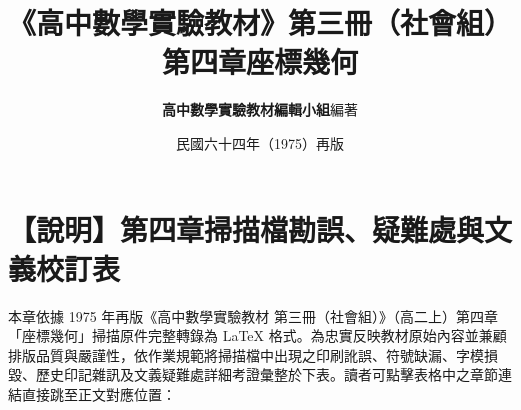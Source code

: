 \documentclass[a4paper,12pt,twoside]{article}
\title{\LARGE\textbf{《高中數學實驗教材》第三冊（社會組）}\\[0.5em] \Large\textbf{第四章\quad 座標幾何}}
\author{\textbf{高中數學實驗教材編輯小組}\quad 編著}
\date{民國六十四年（1975）再版}
\begin{document}
\maketitle
\thispagestyle{firstpage}

\section*{【說明】第四章掃描檔勘誤、疑難處與文義校訂表}
\label{sec:errata_notes_b3_ch4}\label{sec:current_errata}

本章依據 1975 年再版《高中數學實驗教材 第三冊（社會組）》（高二上）第四章「座標幾何」掃描原件完整轉錄為 \LaTeX{} 格式。為忠實反映教材原始內容並兼顧排版品質與嚴謹性，依作業規範將掃描檔中出現之印刷訛誤、符號缺漏、字模損毀、歷史印記雜訊及文義疑難處詳細考證彙整於下表。讀者可點擊表格中之章節連結直接跳至正文對應位置：
\end{document}
